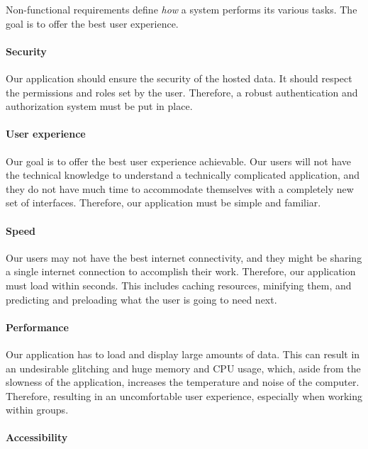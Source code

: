 \begin{toexclude}
	Non-functional requirements define \textit{how} a system performs its various tasks.
	The goal is to offer the best user experience.

	\paragraph{Security}

	Our application should ensure the security of the hosted data.
	It should respect the permissions and roles set by the user.
	Therefore, a robust authentication and authorization system must be put in place.

	\paragraph{User experience}

	Our goal is to offer the best user experience achievable.
	Our users will not have the technical knowledge to understand a technically complicated application, and they do not have much time to accommodate themselves with a completely new set of interfaces.
	Therefore, our application must be simple and familiar.

	\paragraph{Speed}

	Our users may not have the best internet connectivity, and they might be sharing a single internet connection to accomplish their work.
	Therefore, our application must load within seconds.
	This includes caching resources, minifying them, and predicting and preloading what the user is going to need next.

	\paragraph{Performance}

	Our application has to load and display large amounts of data.
	This can result in an undesirable glitching and huge memory and CPU usage, which, aside from the slowness of the application, increases the temperature and noise of the computer.
	Therefore, resulting in an uncomfortable user experience, especially when working within groups.

	\paragraph{Accessibility}


\end{toexclude}

